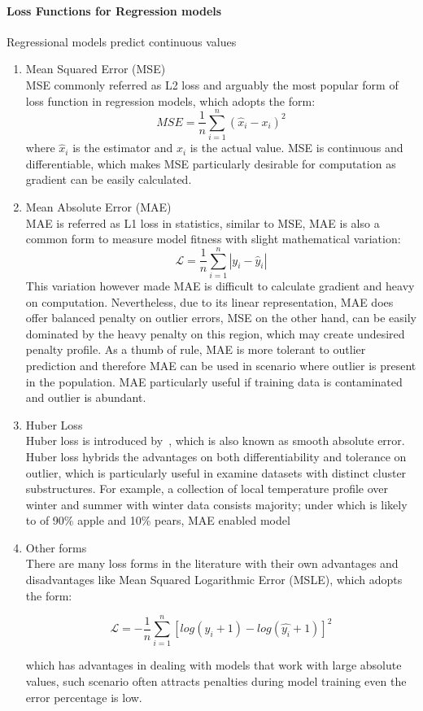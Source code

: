 \paragraph {Loss Functions for Regression models}
Regressional models predict continuous values
\begin{enumerate}
    \item Mean Squared Error (MSE) \\
MSE commonly referred as L2 loss and arguably the most popular form of loss function in regression models, which adopts the form:
\begin{equation}
    MSE = \frac{1}{n}\sum_{i=1}^n (\hat{x}_i - x_i)^2
\end{equation}
where $\hat{x}_i$ is the estimator and $x_i$ is the actual value. MSE is continuous and differentiable, which makes MSE particularly desirable for computation as gradient can be easily calculated. 
    \item Mean Absolute Error (MAE) \\
MAE is referred as L1 loss in statistics, similar to MSE, MAE is also a common form to measure model fitness with slight mathematical variation:
\begin{equation}
    \mathcal{L} = \frac {1}{n} \sum_{i=1}^n |y_i - \hat{y}_i|
\end{equation}
This variation however made MAE is difficult to calculate gradient and heavy on computation. Nevertheless, due to its linear representation, MAE does offer balanced penalty on outlier errors, MSE on the other hand, can be easily dominated by the heavy penalty on this region, which may create undesired penalty profile. As a thumb of rule, MAE is more tolerant to outlier prediction and therefore MAE can be used in scenario where outlier is present in the population. MAE particularly useful if training data is contaminated and outlier is abundant. 
    \item Huber Loss\\
Huber loss is introduced by~\citet{Huber_1964}, which is also known as smooth absolute error. Huber loss hybrids the advantages on both differentiability and tolerance on outlier, which is particularly useful in examine datasets with distinct cluster substructures. For example, a collection of local temperature profile over winter and summer with winter data consists majority; under which is likely to of 90\% apple and 10\% pears, MAE enabled model 
    \item Other forms\\
There are many loss forms in the literature with their own advantages and disadvantages like Mean Squared Logarithmic Error (MSLE), which adopts the form:

\begin{equation}
    \mathcal{L} = -\frac{1}{n}\sum_{i=1}^n [log (y_i + 1) -  log(\hat{y_i} + 1) ]^2 
\end{equation}

which has advantages in dealing with models that work with large absolute values, such scenario often attracts penalties during model training even the error percentage is low. 
\end{enumerate}

